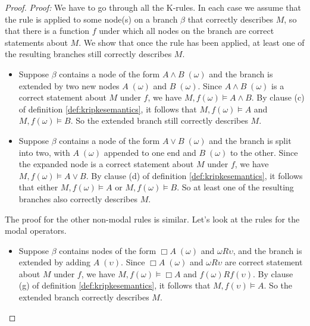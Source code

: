 \begin{proof}
  \emph{Proof:} We have to go through all the K-rules. In each case we assume
  that the rule is applied to some node(s) on a branch $\beta$ that correctly
  describes $M$, so that there is a function $f$ under which all nodes on
  the branch are correct statements about $M$. We show that once the rule has
  been applied, at least one of the resulting branches still correctly describes
  $M$.
  
  \medskip
  \begin{itemize}
  \itemsep1mm
  
    \item Suppose $\beta$ contains a node of the form $A \land B \;(\omega)$ and
          the branch is extended by two new nodes $A \;(\omega)$ and
          $B \;(\omega)$. Since $A \land B \; (\omega)$ is a correct statement
          about $M$ under $f$, we have $M,f(\omega) \models A \land B$. By
          clause (c) of definition \ref{def:kripkesemantics}, it follows that
          $M,f(\omega) \models A$ and $M,f(\omega) \models B$. So the extended
          branch still correctly describes $M$.

    \item Suppose $\beta$ contains a node of the form $A \lor B \;(\omega)$ and
          the branch is split into two, with $A \;(\omega)$ appended to one end
          and $B \;(\omega)$ to the other. Since the expanded node is a correct
          statement about $M$ under $f$, we have $M,f(\omega) \models A \lor B$.
          By clause (d) of definition \ref{def:kripkesemantics}, it follows that
          either $M,f(\omega) \models A$ or $M,f(\omega) \models B$. So at least
          one of the resulting branches also correctly describes $M$.
          
  \end{itemize}
  The proof for the other non-modal rules is similar. Let's look at the rules
  for the modal operators.

  \begin{itemize}
    \itemsep1mm
    
    \item Suppose $\beta$ contains nodes of the form $\Box A \;(\omega)$ and
          $\omega R \upsilon$, and the branch is extended by adding
          $A \;(\upsilon)$. Since $\Box A \;(\omega)$ and $\omega R \upsilon$
          are correct statement about $M$ under $f$, we have
          $M,f(\omega) \models \Box A$ and $f(\omega)Rf(\upsilon)$. By clause
          (g) of definition \ref{def:kripkesemantics}, it follows that
          $M,f(\upsilon) \models A$. So the extended branch correctly describes
          $M$.


\end{itemize}
\end{proof}
